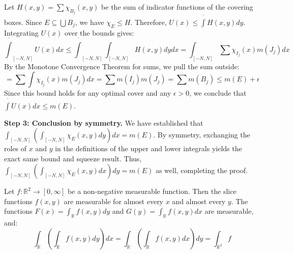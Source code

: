 \begin{pfbox}
    Let $H(x,y) = \displaystyle\sum \chi_{B_j}(x,y)$ be the sum of indicator functions of the covering boxes. Since $E \subseteq \bigcup B_j$, we have $\chi_E \le H$. Therefore, $U(x) \le \overline{\int} H(x,y)dy$.
    Integrating $U(x)$ over the bounds gives:
    $$ \overline{\int}_{[-N,N]} U(x)dx \le \overline{\int}_{[-N,N]} \int_{[-N,N]} H(x,y)dydx = \int_{[-N,N]} \displaystyle\sum \chi_{I_j}(x) m(J_j) dx $$
    By the Monotone Convergence Theorem for sums, we pull the sum outside:
    $$ = \displaystyle\sum \int \chi_{I_j}(x) m(J_j) dx = \displaystyle\sum m(I_j)m(J_j) = \displaystyle\sum m(B_j) \le m(E) + \epsilon $$
    Since this bound holds for any optimal cover and any $\epsilon > 0$, we conclude that $\overline{\int} U(x)dx \le m(E)$. 
    
    \textbf{Step 3: Conclusion by symmetry.}
    We have established that $\int_{[-N,N]} \left( \int_{[-N,N]} \chi_E(x,y) dy \right) dx = m(E)$. By symmetry, exchanging the roles of $x$ and $y$ in the definitions of the upper and lower integrals yields the exact same bound and squeeze result. Thus, $\int_{[-N,N]} \left( \int_{[-N,N]} \chi_E(x,y) dx \right) dy = m(E)$ as well, completing the proof.
\end{pfbox}


\begin{theorem}[Tonelli]
    Let $f: \mathbb{R}^2 \rightarrow [0, \infty]$ be a non-negative measurable function. Then the slice functions $f(x,y)$ are measurable for almost every $x$ and almost every $y$. The functions $F(x) = \int_\mathbb{R} f(x,y) dy$ and $G(y) = \int_\mathbb{R} f(x,y) dx$ are measurable, and:
    $$ \int_\mathbb{R} \left( \int_\mathbb{R} f(x,y) dy \right) dx = \int_\mathbb{R} \left( \int_\mathbb{R} f(x,y) dx \right) dy = \int_{\mathbb{R}^2} f $$
\end{theorem}

